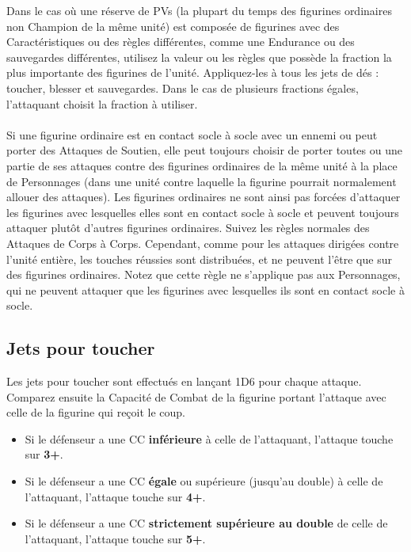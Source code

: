 Dans le cas où une réserve de PVs (la plupart du temps des figurines ordinaires non Champion de la même unité) est composée de figurines avec des Caractéristiques ou des règles différentes, comme une Endurance ou des sauvegardes différentes, utilisez la valeur ou les règles que possède la fraction la plus importante des figurines de l'unité. Appliquez-les à tous les jets de dés : toucher, blesser et sauvegardes. Dans le cas de plusieurs fractions égales, l'attaquant choisit la fraction à utiliser.

\paragraph{\swirlingmelee}

Si une figurine ordinaire est en contact socle à socle avec un ennemi ou peut porter des Attaques de Soutien, elle peut toujours choisir de porter toutes ou une partie de ses attaques contre des figurines ordinaires de la même unité à la place de Personnages (dans une unité contre laquelle la figurine pourrait normalement allouer des attaques). Les figurines ordinaires ne sont ainsi pas forcées d'attaquer les figurines avec lesquelles elles sont en contact socle à socle et peuvent toujours attaquer plutôt d'autres figurines ordinaires. Suivez les règles normales des Attaques de Corps à Corps. Cependant, comme pour les attaques dirigées contre l'unité entière, les touches réussies sont distribuées, et ne peuvent l'être que sur des figurines ordinaires. Notez que cette règle ne s'applique pas aux Personnages, qui ne peuvent attaquer que les figurines avec lesquelles ils sont en contact socle à socle.

\newpage
\subsection{Jets pour toucher}

Les jets pour toucher sont effectués en lançant 1D6 pour chaque attaque. Comparez ensuite la Capacité de Combat de la figurine portant l'attaque avec celle de la figurine qui reçoit le coup.
\begin{itemize}[label={-}]
\item Si le défenseur a une CC \textbf{inférieure} à celle de l'attaquant, l'attaque touche sur \textbf{3+}.
\item Si le défenseur a une CC \textbf{égale} ou supérieure (jusqu'au double) à celle de l'attaquant, l'attaque touche sur \textbf{4+}.
\item Si le défenseur a une CC \textbf{strictement supérieure au double} de celle de l'attaquant, l'attaque touche sur \textbf{5+}.
\end{itemize}

